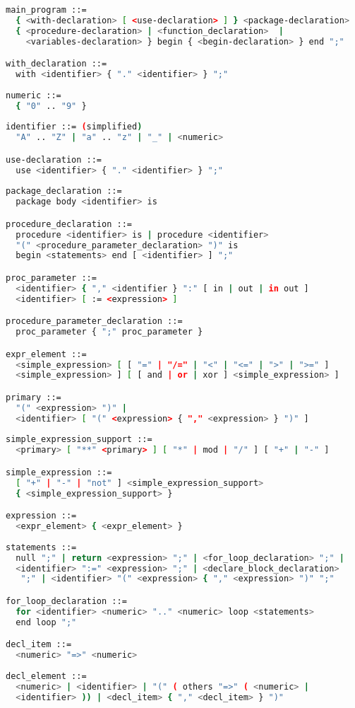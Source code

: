 \documentclass{acmtrans2m}
\begin{document}
\begin{lstlisting}[language=bash,numbers=none]
main_program ::=
  { <with-declaration> [ <use-declaration> ] } <package-declaration>
  { <procedure-declaration> | <function_declaration>  | 
    <variables-declaration> } begin { <begin-declaration> } end ";"

with_declaration ::= 
  with <identifier> { "." <identifier> } ";"
 
numeric ::=
  { "0" .. "9" }
  
identifier ::= (simplified)
  "A" .. "Z" | "a" .. "z" | "_" | <numeric>

use-declaration ::= 
  use <identifier> { "." <identifier> } ";"
  
package_declaration ::=
  package body <identifier> is

procedure_declaration ::=
  procedure <identifier> is | procedure <identifier> 
  "(" <procedure_parameter_declaration> ")" is
  begin <statements> end [ <identifier> ] ";"

proc_parameter ::=
  <identifier> { "," <identifier } ":" [ in | out | in out ] 
  <identifier> [ := <expression> ]

procedure_parameter_declaration ::= 
  proc_parameter { ";" proc_parameter }

expr_element ::=
  <simple_expression> [ [ "=" | "/=" | "<" | "<=" | ">" | ">=" ] 
  <simple_expression> ] [ [ and | or | xor ] <simple_expression> ]

primary ::=
  "(" <expression> ")" | 
  <identifier> [ "(" <expression> { "," <expression> } ")" ]
  
simple_expression_support ::= 
  <primary> [ "**" <primary> ] [ "*" | mod | "/" ] [ "+" | "-" ]

simple_expression ::=
  [ "+" | "-" | "not" ] <simple_expression_support>
  { <simple_expression_support> }

expression ::=
  <expr_element> { <expr_element> }
  
statements ::=
  null ";" | return <expression> ";" | <for_loop_declaration> ";" | 
  <identifier> ":=" <expression> ";" | <declare_block_declaration>
   ";" | <identifier> "(" <expression> { "," <expression> ")" ";"

for_loop_declaration ::=
  for <identifier> <numeric> ".." <numeric> loop <statements> 
  end loop ";"

decl_item ::=
  <numeric> "=>" <numeric>
  
decl_element ::=
  <numeric> | <identifier> | "(" ( others "=>" ( <numeric> | 
  <identifier> )) | <decl_item> { "," <decl_item> } ")" 


\end{lstlisting}
\end{document}

